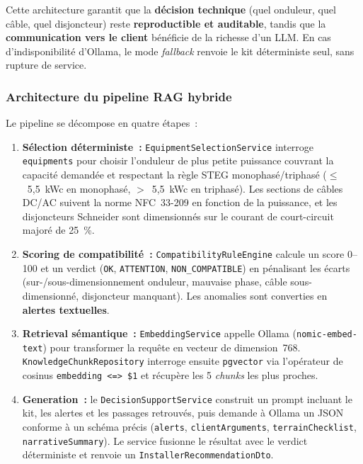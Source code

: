 Cette architecture garantit que la \textbf{décision technique} (quel
onduleur, quel câble, quel disjoncteur) reste \textbf{reproductible et
auditable}, tandis que la \textbf{communication vers le client} bénéficie
de la richesse d'un LLM. En cas d'indisponibilité d'Ollama, le mode
\textit{fallback} renvoie le kit déterministe seul, sans rupture de service.

\subsubsection{Architecture du pipeline RAG hybride}

Le pipeline se décompose en quatre étapes~:

\begin{enumerate}
  \item \textbf{Sélection déterministe~:} \texttt{Equip\-mentSelectionService}
    interroge \texttt{equipments} pour choisir l'onduleur de plus petite
    puissance couvrant la capacité demandée et respectant la règle STEG
    monophasé/triphasé ($\leq$~5,5~kWc en monophasé, $>$~5,5~kWc en
    triphasé). Les sections de câbles DC/AC suivent la norme NFC~33-209
    en fonction de la puissance, et les disjoncteurs Schneider sont
    dimensionnés sur le courant de court-circuit majoré de 25~\%.
  \item \textbf{Scoring de compatibilité~:} \texttt{Compatibility\-RuleEngine}
    calcule un score 0--100 et un verdict (\texttt{OK},
    \texttt{ATTENTION}, \texttt{NON\_COMPATIBLE}) en pénalisant les
    écarts (sur-/sous-dimensionnement onduleur, mauvaise phase, câble
    sous-dimensionné, disjoncteur manquant). Les anomalies sont
    converties en \textbf{alertes textuelles}.
  \item \textbf{Retrieval sémantique~:} \texttt{Embed\-dingService}
    appelle Ollama (\texttt{nomic-embed-text}) pour transformer la
    requête en vecteur de dimension~768. \texttt{Knowledge\-Chunk\-Repository}
    interroge ensuite \texttt{pgvector} via l'opérateur de cosinus
    \texttt{embedding <=> \$1} et récupère les 5 \textit{chunks} les
    plus proches.
  \item \textbf{Generation~:} le \texttt{DecisionSupportService} construit
    un prompt incluant le kit, les alertes et les passages retrouvés,
    puis demande à Ollama un JSON conforme à un schéma précis
    (\texttt{alerts}, \texttt{clientArguments}, \texttt{terrainChecklist},
    \texttt{narrativeSummary}). Le service fusionne le résultat avec le
    verdict déterministe et renvoie un \texttt{InstallerRecommendationDto}.
\end{enumerate}

